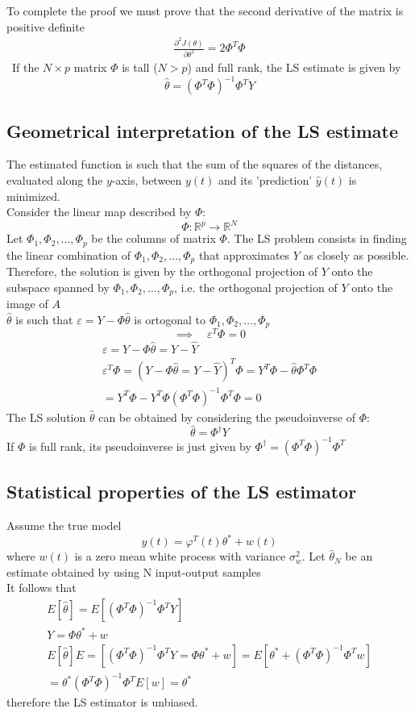 \documentclass{book}
\begin{document}
To complete the proof we must prove that the second derivative of the matrix is positive definite 
\begin{gather*}
    \frac{\partial^2 J(\theta)}{\partial\theta^2}=2\Phi^T\Phi
\end{gather*}\
If the $N \times p$ matrix $\Phi$ is tall ($N>p$) and full rank, the LS estimate is given by
\begin{equation}
    \hat{\theta} = (\Phi^T\Phi)^{-1}\Phi^TY
\end{equation}



\subsection{Geometrical interpretation of the LS estimate}
The estimated function is such that the sum of the squares of the distances, evaluated along the $y$-axis, between $y(t)$ and its 'prediction' $\hat{y}(t)$ is minimized.\\
Consider the linear map described by $\Phi$:
\[
    \Phi : \mathbb{R}^p\to\mathbb{R}^N
\]
Let $\Phi_1,\Phi_2,\dots,\Phi_p$ be the columns of matrix $\Phi$. The LS problem consists in finding the linear combination of $\Phi_1,\Phi_2,\dots,\Phi_p$ that approximates $Y$ as closely as possible. Therefore, the solution is given by the orthogonal projection of $Y$ onto the subspace spanned by $\Phi_1,\Phi_2,\dots,\Phi_p$, i.e. the orthogonal projection of $Y$ onto the image of $A$
\\$\hat{\theta}$ is such that $\varepsilon=Y-\Phi\hat{\theta}$ is ortogonal to $\Phi_1,\Phi_2,\dots,\Phi_p$
\[
    \implies \quad \varepsilon^T\Phi = 0
\]
\begin{gather*}
    \varepsilon = Y-\Phi\hat{\theta}=Y-\hat{Y}\\
    \varepsilon^T\Phi=(Y-\Phi\hat{\theta}=Y-\hat{Y})^T\Phi=Y^T\Phi-\hat{\theta}\Phi^T\Phi\\
    =Y^T\Phi-Y^T\Phi(\Phi^T\Phi)^{-1}\Phi^T\Phi = 0
\end{gather*}
The LS solution $\hat{\theta}$ can be obtained by considering the pseudoinverse of $\Phi$:
\[
    \hat{\theta} = \Phi^\dagger Y
\]
If $\Phi$ is  full rank, its pseudoinverse is just given by $\Phi^\dagger = (\Phi^T\Phi)^{-1}\Phi^T$
\subsection{Statistical properties of the LS estimator}
Assume the true model
\[
    y(t)=\varphi^T(t)\theta^* + w(t)
\]
where $w(t)$ is a zero mean white process with variance $\sigma_w^2$. Let $\hat{\theta}_N$ be an estimate obtained by using N input-output samples\\
It follows that
\begin{gather*}
    E[\hat{\theta}] = E[(\Phi^T\Phi)^{-1}\Phi^TY]\\
    Y=\Phi\theta^*+w\\
    E[\hat{\theta}]E=[(\Phi^T\Phi)^{-1}\Phi^TY=\Phi\theta^*+w]=E[\theta^*+(\Phi^T\Phi)^{-1}\Phi^Tw]\\
    =\theta^*(\Phi^T\Phi)^{-1}\Phi^TE[w]=\theta^*
\end{gather*}
therefore the LS estimator is unbiased.
\end{document}

